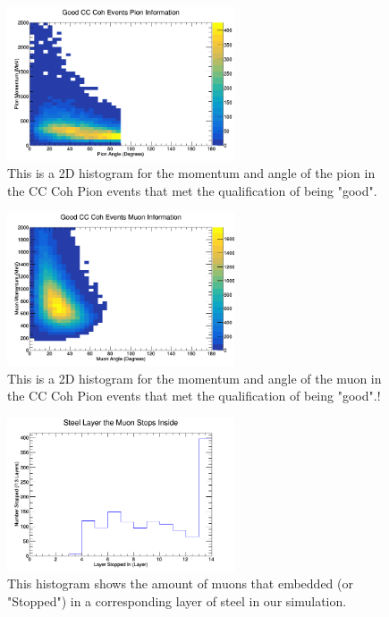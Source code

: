\documentclass[11pt]{article}
\begin{document}
\begin{figure}[H]
\centering
\includegraphics[width=0.6\textwidth]{NewNMBergerSehgalImages/5-GoodCCCohPionInfoNMBS.png}
\caption{This is a 2D histogram for the momentum and angle of the pion in the CC Coh Pion events that met the qualification of being "good".}
\end{figure}

\begin{figure}[H]
\centering
\includegraphics[width=0.6\textwidth]{NewNMBergerSehgalImages/6-GoodCCCohMuonInfoNMBS.png}
\caption{This is a 2D histogram for the momentum and angle of the muon in the CC Coh Pion events that met the qualification of being "good".!}
\end{figure}

\begin{figure}[H]
\centering
\includegraphics[width=0.6\textwidth]{NewNMBergerSehgalImages/7-LayerPenetrationNMBS.png}
\caption{This histogram shows the amount of muons that embedded (or "Stopped") in a corresponding layer of steel in our simulation.}
\end{figure}
\end{document}
